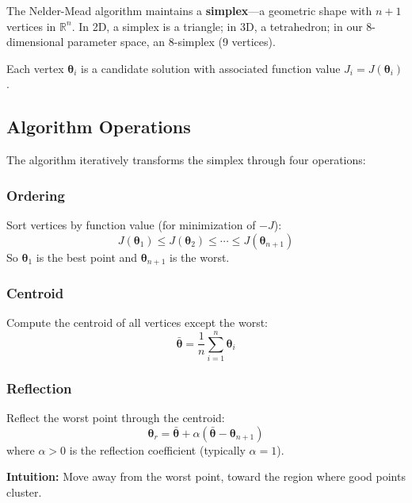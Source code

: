 \documentclass[11pt]{article}
\begin{document}
The Nelder-Mead algorithm maintains a \textbf{simplex}---a geometric shape with $n+1$ vertices in $\mathbb{R}^n$. In 2D, a simplex is a triangle; in 3D, a tetrahedron; in our 8-dimensional parameter space, an 8-simplex (9 vertices).

Each vertex $\boldsymbol{\theta}_i$ is a candidate solution with associated function value $J_i = J(\boldsymbol{\theta}_i)$.

\subsection{Algorithm Operations}

The algorithm iteratively transforms the simplex through four operations:

\subsubsection{Ordering}

Sort vertices by function value (for minimization of $-J$):
\begin{equation}
    J(\boldsymbol{\theta}_1) \leq J(\boldsymbol{\theta}_2) \leq \cdots \leq J(\boldsymbol{\theta}_{n+1})
\end{equation}
So $\boldsymbol{\theta}_1$ is the best point and $\boldsymbol{\theta}_{n+1}$ is the worst.

\subsubsection{Centroid}

Compute the centroid of all vertices except the worst:
\begin{equation}
    \bar{\boldsymbol{\theta}} = \frac{1}{n} \sum_{i=1}^{n} \boldsymbol{\theta}_i
\end{equation}

\subsubsection{Reflection}

Reflect the worst point through the centroid:
\begin{equation}
    \boldsymbol{\theta}_r = \bar{\boldsymbol{\theta}} + \alpha(\bar{\boldsymbol{\theta}} - \boldsymbol{\theta}_{n+1})
\end{equation}
where $\alpha > 0$ is the reflection coefficient (typically $\alpha = 1$).

\textbf{Intuition:} Move away from the worst point, toward the region where good points cluster.
\end{document}
